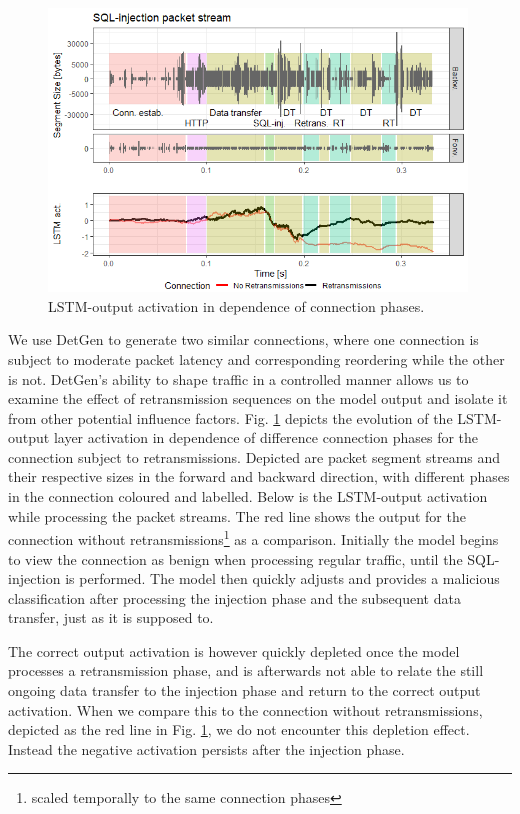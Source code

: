 \documentclass[runningheads]{llncs}
\begin{document}
\begin{figure}
\centering
\includegraphics[width=0.99\textwidth]{images/LSTM_activation_new.png}
\caption{LSTM-output activation in dependence of connection phases.}\label{fig:LSTM_act}
\end{figure}

We use DetGen to generate two similar connections, where one connection is subject to moderate packet latency and corresponding reordering while the other is not. DetGen's ability to shape traffic in a controlled manner  allows us to examine the effect of retransmission sequences on the model output and isolate it from other potential influence factors.
Fig. \ref{fig:LSTM_act} depicts the evolution of the LSTM-output layer activation in dependence of difference connection phases for the connection subject to retransmissions. Depicted are packet segment streams and their respective sizes in the forward and backward direction, with different phases in the connection coloured and labelled. Below is the LSTM-output activation while processing the packet streams. The red line shows the output for the connection without retransmissions\footnote{scaled temporally to the same connection phases} as a comparison.
Initially the model begins to view the connection as benign when processing regular traffic, until the SQL-injection is performed. The model then quickly adjusts and provides a malicious classification after processing the injection phase and the subsequent data transfer, just as it is supposed to. 

The correct output activation is however quickly depleted once the model processes a retransmission phase, and is afterwards not able to relate the still ongoing data transfer to the injection phase and return to the correct output activation. When we compare this to the connection without retransmissions, depicted as the red line in Fig. \ref{fig:LSTM_act}, we do not encounter this depletion effect. Instead the negative activation persists after the injection phase.
\end{document}
